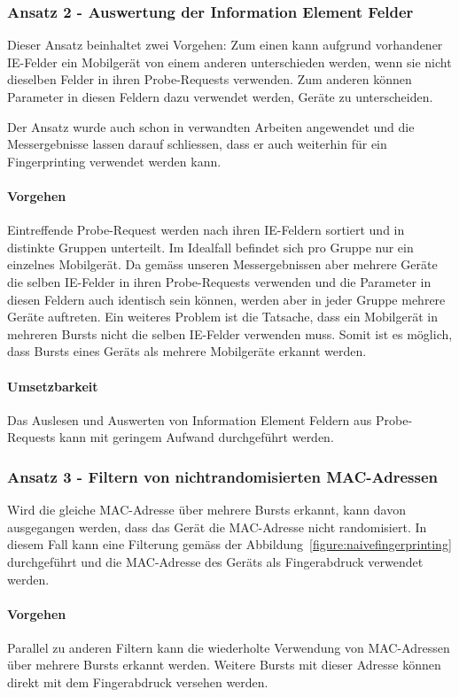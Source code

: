 \subsubsection*{Ansatz 2 - Auswertung der Information Element Felder}
Dieser Ansatz beinhaltet zwei Vorgehen:
Zum einen kann aufgrund vorhandener IE-Felder ein Mobilgerät von einem 
anderen unterschieden werden, wenn sie nicht dieselben Felder in ihren 
Probe-Requests verwenden.
Zum anderen können Parameter in diesen Feldern dazu verwendet werden,
Geräte zu unterscheiden.

Der Ansatz wurde auch schon in verwandten Arbeiten angewendet und die 
Messergebnisse lassen darauf schliessen, dass er auch weiterhin für 
ein Fingerprinting verwendet werden kann.

\paragraph{Vorgehen}
Eintreffende Probe-Request werden nach ihren IE-Feldern sortiert und in 
distinkte Gruppen unterteilt. 
Im Idealfall befindet sich pro Gruppe nur ein einzelnes Mobilgerät.
Da gemäss unseren Messergebnissen aber mehrere Geräte die selben IE-Felder 
in ihren Probe-Requests verwenden und die Parameter in diesen Feldern 
auch identisch sein können, werden aber in jeder Gruppe mehrere Geräte auftreten.
Ein weiteres Problem ist die Tatsache, dass ein Mobilgerät in mehreren Bursts
nicht die selben IE-Felder verwenden muss. 
Somit ist es möglich, dass Bursts eines Geräts als mehrere Mobilgeräte erkannt 
werden.

\paragraph{Umsetzbarkeit}
Das Auslesen und Auswerten von Information Element Feldern aus Probe-Requests 
kann mit geringem Aufwand durchgeführt werden.

\subsubsection*{Ansatz 3 - Filtern von nichtrandomisierten MAC-Adressen}
Wird die gleiche MAC-Adresse über mehrere Bursts erkannt, kann davon ausgegangen 
werden, dass das Gerät die MAC-Adresse nicht randomisiert. In diesem Fall kann
eine Filterung gemäss der Abbildung~\ref{figure:naivefingerprinting} durchgeführt
und die MAC-Adresse des Geräts als Fingerabdruck verwendet werden.

\paragraph{Vorgehen}
Parallel zu anderen Filtern kann die wiederholte Verwendung von MAC-Adressen über
mehrere Bursts erkannt werden. Weitere Bursts mit dieser Adresse können direkt 
mit dem Fingerabdruck versehen werden.


